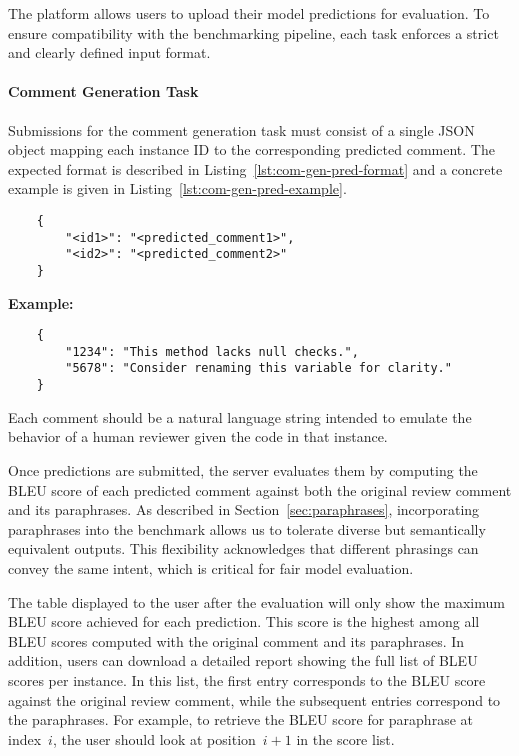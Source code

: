 The platform allows users to upload their model predictions for evaluation. To ensure compatibility
with the benchmarking pipeline, each task enforces a strict and clearly defined input format.

\paragraph{Comment Generation Task}

Submissions for the comment generation task must consist of a single JSON object mapping each
instance ID to the corresponding predicted comment. The expected format is described in
Listing~\ref{lst:com-gen-pred-format} and a concrete example is given in
Listing~\ref{lst:com-gen-pred-example}.

\begin{listing}[!ht]
	\begin{verbatim}
    {
        "<id1>": "<predicted_comment1>",
        "<id2>": "<predicted_comment2>"
    }
    \end{verbatim}
	\caption{JSON format of predictions for comment generation}
	\label{lst:com-gen-pred-format}
\end{listing}



\begin{listing}[!ht]
	\textbf{Example:}
	\begin{verbatim}
    {
        "1234": "This method lacks null checks.",
        "5678": "Consider renaming this variable for clarity."
    }
    \end{verbatim}
	\caption{Example of valid comment generation submission}
	\label{lst:com-gen-pred-example}
\end{listing}

Each comment should be a natural language string intended to emulate the behavior of a human
reviewer given the code in that instance.

Once predictions are submitted, the server evaluates them by computing the BLEU score of each
predicted comment against both the original review comment and its paraphrases. As described in
Section~\ref{sec:paraphrases}, incorporating paraphrases into the benchmark allows us to tolerate
diverse but semantically equivalent outputs. This flexibility acknowledges that different phrasings
can convey the same intent, which is critical for fair model evaluation.

The table displayed to the user after the evaluation will only show the maximum BLEU score achieved
for each prediction. This score is the highest among all BLEU scores computed with the original
comment and its paraphrases. In addition, users can download a detailed report showing the full list
of BLEU scores per instance. In this list, the first entry corresponds to the BLEU score against the
original review comment, while the subsequent entries correspond to the paraphrases. For example, to
retrieve the BLEU score for paraphrase at index~$i$, the user should look at position~$i+1$ in the
score list.

